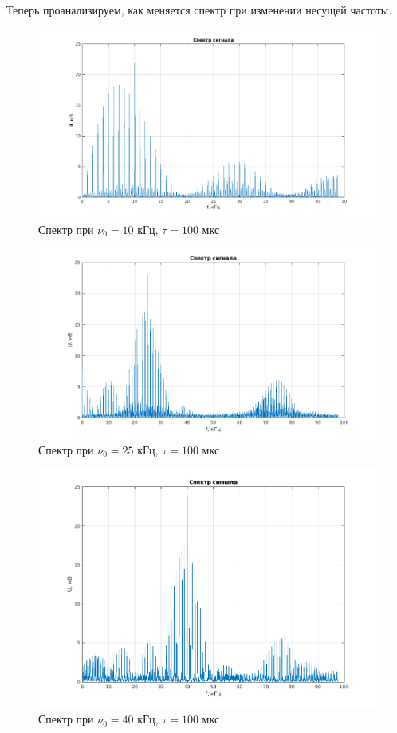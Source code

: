 \documentclass[a4paper, 12pt]{article}%
\begin{document}
Теперь проанализируем, как меняется спектр при изменении несущей частоты.

\begin{figure}[h!]
    \centering
    \includegraphics[width = 14 cm]{images/2_10k.png}
    \caption{Спектр при $\nu_0 = 10$ кГц, $\tau = 100$ мкс}
\end{figure}

\begin{figure}[h!]
    \centering
    \includegraphics[width = 14 cm]{images/2_25k.png}
    \caption{Спектр при $\nu_0 = 25$ кГц, $\tau = 100$ мкс}
\end{figure}

\begin{figure}[h!]
    \centering
    \includegraphics[width = 14 cm]{images/2_40k.png}
    \caption{Спектр при $\nu_0 = 40$ кГц, $\tau = 100$ мкс}
\end{figure}
\end{document}

